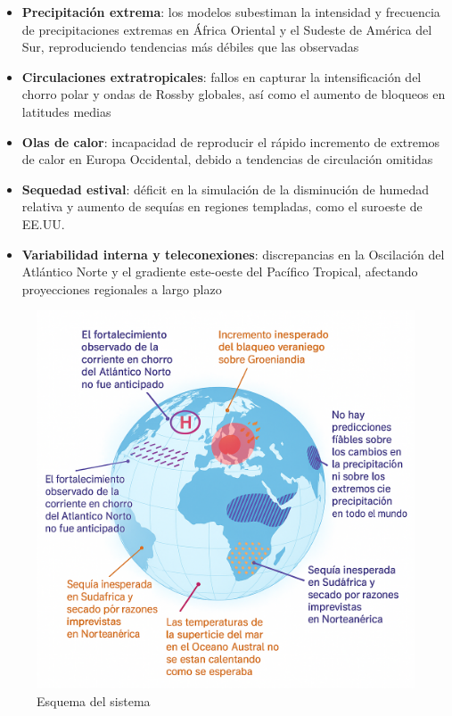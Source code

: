 \documentclass[
  10pt,
  a4paper,
  DIV=11,
  numbers=noendperiod,
  open=any]{scrreprt}
\providecommand{\tightlist}{%
  \setlength{\itemsep}{0pt}\setlength{\parskip}{0pt}}
\numberwithin{equation}{chapter}
\numberwithin{equation}{section}
\renewcommand{\[}{\begin{equation}}
\renewcommand{\]}{\end{equation}}
\begin{document}
\begin{itemize}
\tightlist
\item
  \textbf{Precipitación extrema}: los modelos subestiman la intensidad y
  frecuencia de precipitaciones extremas en África Oriental y el Sudeste
  de América del Sur, reproduciendo tendencias más débiles que las
  observadas\\
\item
  \textbf{Circulaciones extratropicales}: fallos en capturar la
  intensificación del chorro polar y ondas de Rossby globales, así como
  el aumento de bloqueos en latitudes medias\\
\item
  \textbf{Olas de calor}: incapacidad de reproducir el rápido incremento
  de extremos de calor en Europa Occidental, debido a tendencias de
  circulación omitidas
\item
  \textbf{Sequedad estival}: déficit en la simulación de la disminución
  de humedad relativa y aumento de sequías en regiones templadas, como
  el suroeste de EE.UU.\\
\item
  \textbf{Variabilidad interna y teleconexiones}: discrepancias en la
  Oscilación del Atlántico Norte y el gradiente este-oeste del Pacífico
  Tropical, afectando proyecciones regionales a largo plazo
\end{itemize}

\begin{figure}

{\centering \includegraphics[width=0.6\linewidth,height=\textheight,keepaspectratio]{04-clima/fallos.png}

}

\caption{Esquema del sistema}

\end{figure}%
\end{document}

